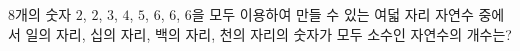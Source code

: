 8개의 숫자 $2$, $2$, $3$, $4$, $5$, $6$, $6$, $6$을 모두 이용하여 만들 수 있는 여덟 자리 자연수 중에서 일의 자리, 십의 자리, 백의 자리, 천의 자리의 숫자가 모두 소수인 자연수의 개수는?
